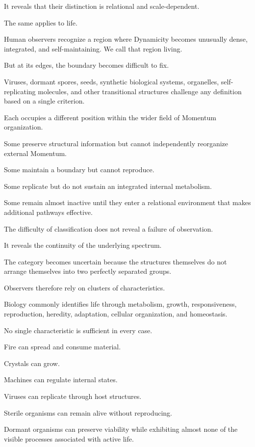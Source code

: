 It reveals that their distinction is relational and scale-dependent.

The same applies to life.

Human observers recognize a region where Dynamicity becomes unusually dense, integrated, and self-maintaining. We call that region living.

But at its edges, the boundary becomes difficult to fix.

Viruses, dormant spores, seeds, synthetic biological systems, organelles, self-replicating molecules, and other transitional structures challenge any definition based on a single criterion.

Each occupies a different position within the wider field of Momentum organization.

Some preserve structural information but cannot independently reorganize external Momentum.

Some maintain a boundary but cannot reproduce.

Some replicate but do not sustain an integrated internal metabolism.

Some remain almost inactive until they enter a relational environment that makes additional pathways effective.

The difficulty of classification does not reveal a failure of observation.

It reveals the continuity of the underlying spectrum.

The category becomes uncertain because the structures themselves do not arrange themselves into two perfectly separated groups.

Observers therefore rely on clusters of characteristics.

Biology commonly identifies life through metabolism, growth, responsiveness, reproduction, heredity, adaptation, cellular organization, and homeostasis.

No single characteristic is sufficient in every case.

Fire can spread and consume material.

Crystals can grow.

Machines can regulate internal states.

Viruses can replicate through host structures.

Sterile organisms can remain alive without reproducing.

Dormant organisms can preserve viability while exhibiting almost none of the visible processes associated with active life.

